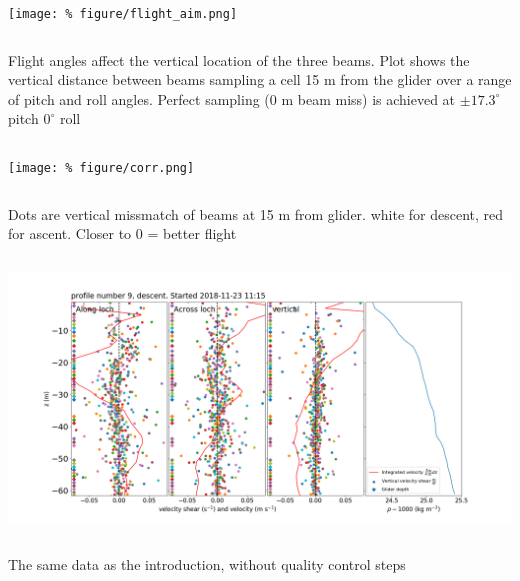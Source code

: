 \documentclass[unknownkeysallowed,usepdftitle=false]{beamer}
\begin{document}
\begin{frame}\label{flight_envelope}
\vspace{-0.3cm}
\begin{center}
\texttt{[image: \%
figure/flight\_aim.png]}
\end{center}
\vspace{-0.3cm}
\begin{columns}
\begin{column}[t]{0.9\textwidth}
Flight angles affect the vertical location of the three beams. Plot shows the vertical distance between beams sampling a cell 15 m from the glider over a range of pitch and roll angles. Perfect sampling (0 m beam miss) is achieved at $\pm17.3^{\circ}$ pitch $0^{\circ}$ roll
\end{column}
\end{columns}
\end{frame}

\begin{frame}\label{ping_corr}
\vspace{-0.3cm}
\begin{center}
\texttt{[image: \%
figure/corr.png]}
\end{center}
\vspace{-0.3cm}
\begin{columns}
\begin{column}[t]{0.9\textwidth}
Dots are vertical missmatch of  beams at 15 m from glider. white for descent, red for ascent. Closer to 0 = better flight
\end{column}
\end{columns}
\end{frame}

\begin{frame}\label{no_qc}
\vspace{-0.3cm}
\begin{center}
\includegraphics[trim=70 20 80 80,clip,width=\paperwidth]{figure/95_noqc.png}
\end{center}
\begin{columns}
\begin{column}[t]{0.9\textwidth}
The same data as the introduction, without quality control steps
\end{column}
\end{columns}
\end{frame}
\end{document}
